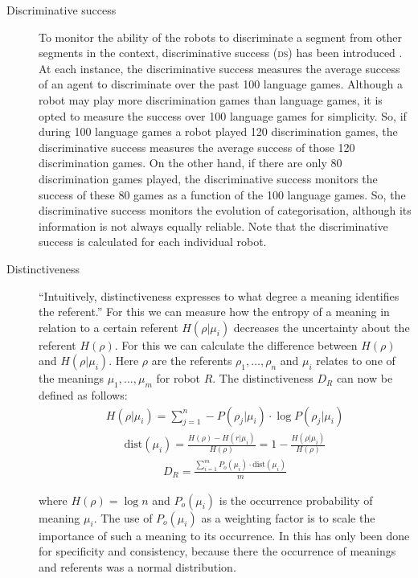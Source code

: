 \begin{description}
\item[Discriminative success] To monitor the ability of
the robots to discriminate a segment from other segments in the
context, discriminative success {\scshape (ds)} has been introduced \citep{steels:1996b}. At each instance, the discriminative success measures the average
success of an agent to discriminate over the past 100 language
games. Although a robot may play more discrimination games than
language games, it is opted to measure the success over 100
language games for simplicity. So, if during 100 language games
a robot played 120 discrimination games, the discriminative success measures the average
success of those 120 discrimination games. On the other hand, if there are only 80 discrimination games played, the discriminative success monitors the success of these 80 games as a function of the 100 language games. So, the discriminative success
monitors the evolution of categorisation, although its information is not always equally reliable. Note that the discriminative success is calculated for each individual robot.
\item[Distinctiveness] ``Intuitively, distinctiveness expresses to what degree a meaning identifies the referent.'' \citep{dejong:2000} For this we can measure how the entropy of a meaning in relation to a certain referent $H(\rho|\mu_i)$ decreases the uncertainty about the referent $H(\rho)$. For this we can calculate the difference between $H(\rho)$ and $H(\rho|\mu_i)$. Here $\rho$ are the referents $\rho_1,\ldots,\rho_n$ and $\mu_i$ relates to one of the meanings $\mu_1,\ldots,\mu_m$ for robot $R$. The distinctiveness $D_R$ can now be defined as follows:
\begin{eqnarray}
H(\rho|\mu_i)=\sum_{j=1}^n -P(\rho_j|\mu_i) \cdot \log P(\rho_j|\mu_i)
\end{eqnarray}
\begin{eqnarray}
\mbox{dist}(\mu_i)=\frac{H(\rho)-H(r|\mu_i)}{H(\rho)}=1-\frac{H(\rho|\mu_i)}{H(\rho)}
\end{eqnarray}
\begin{eqnarray}
D_R=\frac{\sum_{i=1}^m P_o(\mu_i) \cdot \mbox{dist}(\mu_i)}{m}
\end{eqnarray}


where $H(\rho)=\log n$ and $P_o(\mu_i)$ is the occurrence probability of meaning $\mu_i$. The use of $P_o(\mu_i)$ as a weighting factor is to scale the importance of such a meaning to its occurrence. In \citet{dejong:2000} this has only been done for specificity and consistency, because there the occurrence of meanings and referents was a normal distribution.


\end{description}
